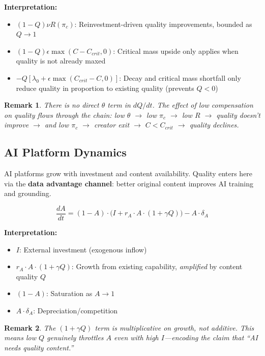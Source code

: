 \documentclass[11pt,a4paper]{article}
\newtheorem{remark}{Remark}
\begin{document}
\textbf{Interpretation:}
\begin{itemize}
    \item $(1-Q)\nu R(\pi_c)$: Reinvestment-driven quality improvements, bounded as $Q \to 1$
    \item $(1-Q)\epsilon\max(C - C_{crit}, 0)$: Critical mass upside only applies when quality is not already maxed
    \item $-Q[\lambda_0 + \epsilon\max(C_{crit} - C, 0)]$: Decay and critical mass shortfall only reduce quality in proportion to existing quality (prevents $Q < 0$)
\end{itemize}

\begin{remark}
There is no direct $\theta$ term in $dQ/dt$. The effect of low compensation on quality flows through the chain: low $\theta$ $\rightarrow$ low $\pi_c$ $\rightarrow$ low $R$ $\rightarrow$ quality doesn't improve $\rightarrow$ and low $\pi_c$ $\rightarrow$ creator exit $\rightarrow$ $C < C_{crit}$ $\rightarrow$ quality declines.
\end{remark}

\subsection{AI Platform Dynamics}

AI platforms grow with investment and content availability. Quality enters here via the \textbf{data advantage channel}: better original content improves AI training and grounding.

\begin{equation}
\boxed{
\frac{dA}{dt} = (1-A) \cdot \Big( I + r_A \cdot A \cdot (1 + \gamma Q) \Big) - A \cdot \delta_A
}
\end{equation}

\textbf{Interpretation:}
\begin{itemize}
    \item $I$: External investment (exogenous inflow)
    \item $r_A \cdot A \cdot (1 + \gamma Q)$: Growth from existing capability, \emph{amplified} by content quality $Q$
    \item $(1-A)$: Saturation as $A \rightarrow 1$
    \item $A \cdot \delta_A$: Depreciation/competition
\end{itemize}

\begin{remark}
The $(1 + \gamma Q)$ term is multiplicative on growth, not additive. This means low $Q$ genuinely throttles $A$ even with high $I$---encoding the claim that ``AI needs quality content.''
\end{remark}
\end{document}
